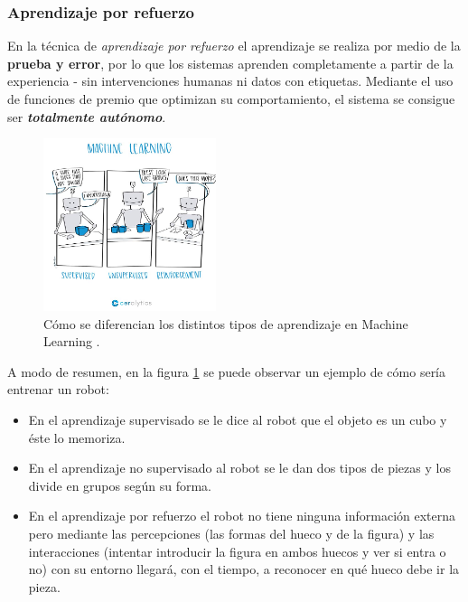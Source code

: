 \subsubsection{Aprendizaje por refuerzo}

En la técnica de \textit{aprendizaje por refuerzo} el aprendizaje se realiza por medio de la \textbf{\textbf{prueba y error}}, por lo que los sistemas aprenden completamente a partir de la experiencia - sin intervenciones humanas ni datos con etiquetas. Mediante el uso de funciones de premio que optimizan su comportamiento, el sistema se consigue ser \textbf{\textit{totalmente autónomo}}. \\

\begin{figure}[h]
    \centering
    \includegraphics[width=0.45\textwidth]{cap2_contextualizacion/images/machine-learning_ceralytics.jpg}
    \caption{Cómo se diferencian los distintos tipos de aprendizaje en Machine Learning \cite{ceralyticsMLtypes}.}
    \label{fig:ml_ceralytics}
\end{figure}

A modo de resumen, en la figura \ref{fig:ml_ceralytics} se puede observar un ejemplo de cómo sería entrenar un robot:

\begin{itemize}
    \item En el aprendizaje supervisado se le dice al robot que el objeto es un cubo y éste lo memoriza.
    \item En el aprendizaje no supervisado al robot se le dan dos tipos de piezas y los divide en grupos según su forma.
    \item En el aprendizaje por refuerzo el robot no tiene ninguna información externa pero mediante las percepciones (las formas del hueco y de la figura) y las interacciones (intentar introducir la figura en ambos huecos y ver si entra o no) con su entorno llegará, con el tiempo, a reconocer en qué hueco debe ir la pieza.
\end{itemize}

